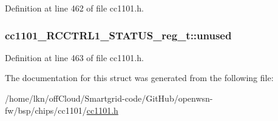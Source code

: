 Definition at line 462 of file cc1101.\+h.

\subsubsection[{\texorpdfstring{unused}{unused}}]{ cc1101\+\_\+\+R\+C\+C\+T\+R\+L1\+\_\+\+S\+T\+A\+T\+U\+S\+\_\+reg\+\_\+t\+::unused}\hypertarget{structcc1101___r_c_c_t_r_l1___s_t_a_t_u_s__reg__t_a4c74e9e6e422838175a25e5fb03dbdca}{}\label{structcc1101___r_c_c_t_r_l1___s_t_a_t_u_s__reg__t_a4c74e9e6e422838175a25e5fb03dbdca}


Definition at line 463 of file cc1101.\+h.



The documentation for this struct was generated from the following file\+:\begin{DoxyCompactItemize}
\item 
/home/lkn/off\+Cloud/\+Smartgrid-\/code/\+Git\+Hub/openwsn-\/fw/bsp/chips/cc1101/\hyperlink{cc1101_8h}{cc1101.\+h}\end{DoxyCompactItemize}
